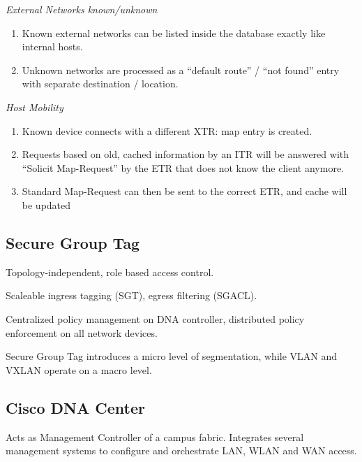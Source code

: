 \vspace{3mm}
\noindent
\emph{External Networks known/unknown}
\begin{enumerate}
    \item Known external networks can be listed inside the database exactly like internal hosts.
    \item Unknown networks are processed as a ``default route'' / ``not found'' entry with separate destination / location.
\end{enumerate}

\vspace{3mm}
\noindent
\emph{Host Mobility}
\begin{enumerate}
    \item Known device connects with a different XTR: map entry is created.
    \item Requests based on old, cached information by an ITR will be answered with ``Solicit Map-Request'' by the ETR that does not know the client anymore.
    \item Standard Map-Request can then be sent to the correct ETR, and cache will be updated 
\end{enumerate}


\subsection{Secure Group Tag}
Topology-independent, role based access control.

Scaleable ingress tagging (SGT), egress filtering (SGACL).

Centralized policy management on DNA controller, distributed policy enforcement on all network devices.

Secure Group Tag introduces a micro level of segmentation, while VLAN and VXLAN operate on a macro level. 

\subsection{Cisco DNA Center}
Acts as Management Controller of a campus fabric. Integrates several management systems to configure and orchestrate LAN, WLAN and WAN access.

